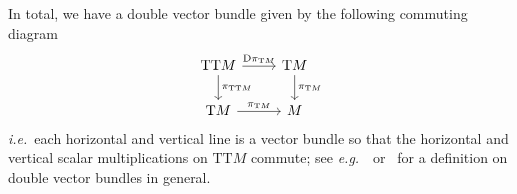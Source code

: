 \documentclass[a4paper,oneside,11pt,bibliography=totoc]{scrartcl}
\def\RPlus{\ensuremath{\mathbin{\rule[.13em]{.66em}{.22em}\hspace{-.44em}\rule[-.08em]{.22em}{.66em}\,}}} %
\def\be{\begin{equation}}
\def\ee{\end{equation}}
\def\bas#1\eas{\begin{align*}#1\end{align*}}
\theoremstyle{plain}
\theoremstyle{remark}
\theoremstyle{definition}
\begin{document}
In total, we have a double vector bundle given by the following commuting diagram
\be\label{DoubleTangentAsDiagram}
	\begin{tikzcd}
		 \mathrm{TT}M \arrow{r}{\mathrm{D}\pi_{\mathrm{T}M}} \arrow{d}{\pi_{\mathrm{TT}M}} & \mathrm{T}M \arrow{d}{\pi_{\mathrm{T}M}} \\
		\mathrm{T}M \arrow[r, "\pi_{\mathrm{T}M}"]& M
	\end{tikzcd}
\ee
\textit{i.e.}\ each horizontal and vertical line is a vector bundle so that the horizontal and vertical scalar multiplications on $\mathrm{TT}M$ commute; see \textit{e.g.}~\cite[\S 3ff.]{Highervectorbundles}\ or \cite[\S 9.1, page 340ff.]{mackenzieGeneralTheory}\ for a definition on double vector bundles in general.
\end{document}
